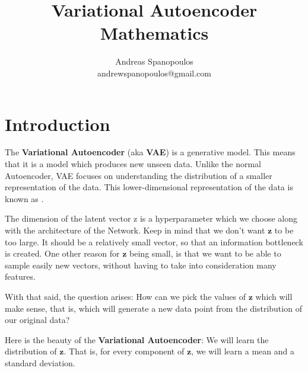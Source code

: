 \documentclass[12pt]{report}
\title{Variational Autoencoder Mathematics}
\author{\LARGE{Andreas Spanopoulos} \\ andrewspanopoulos@gmail.com}
\begin{document}
\maketitle

\section*{Introduction}
\smallskip

The \textbf{Variational Autoencoder} (aka \textbf{VAE}) is a generative model.
This means that it is a model which produces new unseen data. Unlike the normal
Autoencoder, VAE focuses on understanding the distribution of a smaller
representation of the data. This lower-dimensional representation of the data is
known as .
\bigskip

The dimension of the latent vector z is a hyperparameter which we choose along
with the architecture of the Network. Keep in mind that we don't want
$\textbf{z}$ to be too large. It should be a relatively small vector, so that an
information bottleneck is created. One other reason for $\textbf{z}$ being small,
is that we want to be able to sample easily new vectors, without having to take
into consideration many features.
\bigskip

With that said, the question arises: How can we pick the values of $\textbf{z}$
which will make sense, that is, which will generate a new data point from the
distribution of our original data?
\bigskip

Here is the beauty of the \textbf{Variational Autoencoder}: We will learn the
distribution of $\textbf{z}$. That is, for every component of $\textbf{z}$, we
will learn a mean and a standard deviation.
\bigskip
\end{document}
